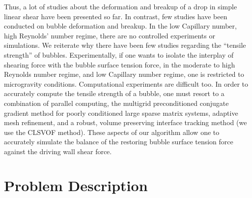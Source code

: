 \documentclass{elsarticle}
\begin{document}
{ Thus, a lot of studies about the deformation and breakup of a drop in simple linear shear have been presented so far. In contrast, few studies have been conducted on bubble deformation and breakup.  In the low Capillary number, high Reynolds' number regime, there are no controlled experiments or simulations.  We reiterate why there have been few studies regarding the ``tensile strength'' of bubbles. Experimentally, if one wants to isolate the interplay of shearing force with the bubble surface tension force, in the moderate to high Reynolds number regime, and low Capillary number regime, one is restricted to microgravity conditions.  Computational experiments are difficult too. In order to accurately compute the tensile strength of a bubble, one must resort to a combination of parallel computing, the multigrid preconditioned conjugate gradient method\cite{tatebe1993multigrid,SusSmiHusOhtZhi07} for poorly conditioned large sparse matrix systems, adaptive mesh refinement\cite{AMReX_JOSS,SusSmiHusOhtZhi07}, and a robust, volume preserving interface tracking method (we use the CLSVOF method\cite{SusPuc00,SusSmiHusOhtZhi07}).  These aspects of our algorithm allow one to accurately simulate the balance of the restoring bubble surface tension force against the driving wall shear force.
}
\section{Problem Description}
\end{document}
